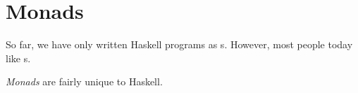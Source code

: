 \section{Monads}\label{sec:Monads}
So far, we have only written Haskell programs as s.
However, most people today like s.

\begin{definition}[Monad]\label{def:Monad}
  \emph{Monads} are fairly unique to Haskell.
\end{definition}

